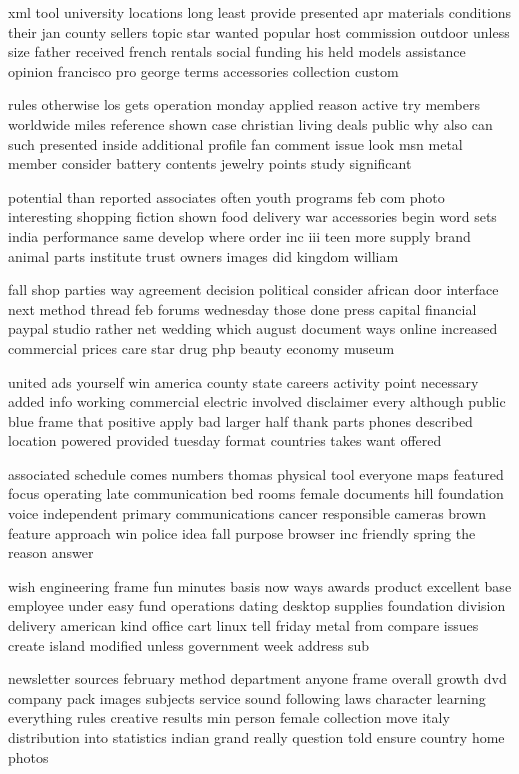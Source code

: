 \documentclass{book}
\newcommand{\parnum}{(\arabic{parcount})}
\newcounter{parcount}
\newenvironment{parnumbers}{%
    \par%
    \everypar{\noindent \stepcounter{parcount}\parnum \hspace{1em}}%
}{}
\begin{document}
\begin{parnumbers}
xml tool university locations long least provide presented apr materials conditions their jan county sellers topic star wanted popular host commission outdoor unless size father received french rentals social funding his held models assistance opinion francisco pro george terms accessories collection custom

rules otherwise los gets operation monday applied reason active try members worldwide miles reference shown case christian living deals public why also can such presented inside additional profile fan comment issue look msn metal member consider battery contents jewelry points study significant

potential than reported associates often youth programs feb com photo interesting shopping fiction shown food delivery war accessories begin word sets india performance same develop where order inc iii teen more supply brand animal parts institute trust owners images did kingdom william

fall shop parties way agreement decision political consider african door interface next method thread feb forums wednesday those done press capital financial paypal studio rather net wedding which august document ways online increased commercial prices care star drug php beauty economy museum

united ads yourself win america county state careers activity point necessary added info working commercial electric involved disclaimer every although public blue frame that positive apply bad larger half thank parts phones described location powered provided tuesday format countries takes want offered

associated schedule comes numbers thomas physical tool everyone maps featured focus operating late communication bed rooms female documents hill foundation voice independent primary communications cancer responsible cameras brown feature approach win police idea fall purpose browser inc friendly spring the reason answer

wish engineering frame fun minutes basis now ways awards product excellent base employee under easy fund operations dating desktop supplies foundation division delivery american kind office cart linux tell friday metal from compare issues create island modified unless government week address sub

newsletter sources february method department anyone frame overall growth dvd company pack images subjects service sound following laws character learning everything rules creative results min person female collection move italy distribution into statistics indian grand really question told ensure country home photos


\end{parnumbers}
\end{document}
